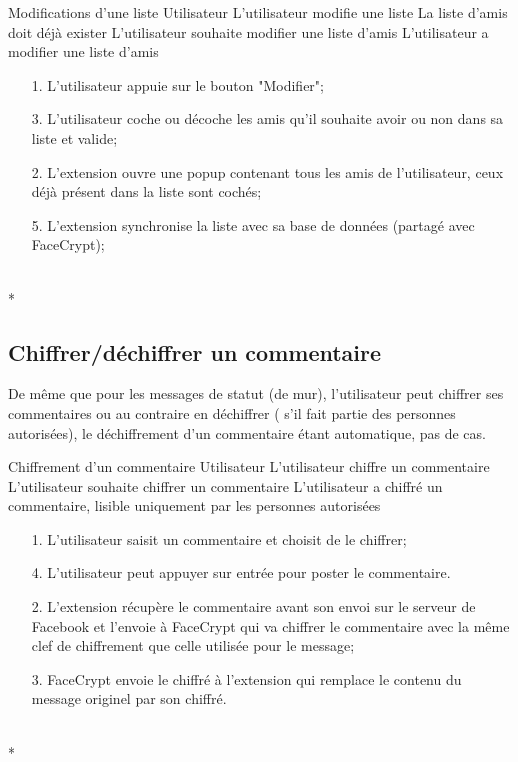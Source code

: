 \documentclass[a4paper,11pt,french]{article}
\begin{document}
\fiche
	{Modifications d'une liste}
	{Utilisateur}
    {L'utilisateur modifie une liste}
    {La liste d'amis doit déjà exister}
    {L'utilisateur souhaite modifier une liste d'amis}
	{L'utilisateur a modifier une liste d'amis}
    {\begin{itemize}
        \item[]
        \item[1.] L'utilisateur appuie sur le bouton "Modifier";
        \item[3.] L'utilisateur coche ou décoche les amis qu'il souhaite
        avoir ou non dans sa liste et valide;
    \end{itemize}}
	{\begin{itemize}
        \item[]
		\item[2.] L'extension ouvre une popup contenant tous les amis de 
		l'utilisateur, ceux déjà présent dans la liste sont cochés;
		\item[5.] L'extension synchronise la liste avec sa base de données
            (partagé avec FaceCrypt);
	\end{itemize}
	}
	{}
\flots
    {\begin{itemize}
    \item[]
    \end{itemize}
    }
    {}
\\*

\subsection{Chiffrer/déchiffrer un commentaire}
De même que pour les messages de statut (de mur), l'utilisateur
peut chiffrer ses commentaires ou au contraire en déchiffrer (
s'il fait partie des personnes autorisées), le déchiffrement d'un commentaire
étant automatique, pas de cas.

\fiche
	{Chiffrement d'un commentaire}
	{Utilisateur}
	{L'utilisateur chiffre un commentaire}
	{}
	{L'utilisateur souhaite chiffrer un commentaire}
	{L'utilisateur a chiffré un commentaire, lisible uniquement par les 
	personnes autorisées}
	{\begin{itemize}
	    \item[]
	  \item[1.] L'utilisateur saisit un commentaire et choisit de le chiffrer;
      \item[4.] L'utilisateur peut appuyer sur entrée pour poster le 
      commentaire.
	\end{itemize}
	}
	{\begin{itemize}
        \item[]
		\item[2.] L'extension récupère le commentaire avant son envoi sur le 
            serveur de Facebook et l'envoie à FaceCrypt qui va chiffrer le 
            commentaire avec la même clef de chiffrement que celle utilisée pour
            le message;
		\item[3.] FaceCrypt envoie le chiffré à l'extension qui remplace le
        contenu du message originel par son chiffré.
	\end{itemize}
	}
	{}
\flots
    {}
	{}    
\\*
\end{document}
